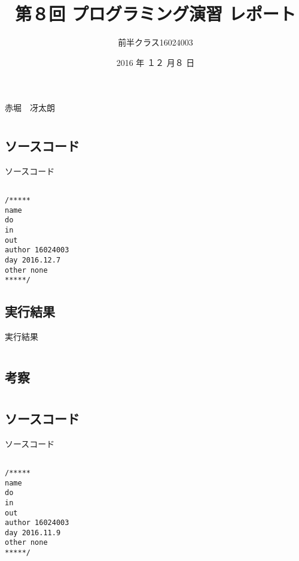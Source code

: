 \documentclass[a4j,titlepage]{jarticle}
\begin{document}

\title{第８回 プログラミング演習 レポート}

\author{前半クラス16024003}{赤堀　冴太朗}

\date{2016 年 １２ 月８ 日}
\maketitle


\section{}
\subsection{ソースコード}
\begin{breakitembox}[l]{ソースコード}
\begin{verbatim}

/*****
name 
do 
in 
out 
author 16024003
day 2016.12.7
other none
*****/

\end{verbatim}
\end{breakitembox}

\subsection{実行結果}
\begin{itembox}[l]{実行結果}
\begin{verbatim}

\end{verbatim}
\end{itembox}

\subsection{考察}


\section{}
\subsection{ソースコード}
\begin{breakitembox}[l]{ソースコード}
\begin{verbatim}

/*****
name 
do 
in 
out 
author 16024003
day 2016.11.9
other none 
*****/

\end{verbatim}
\end{breakitembox}
\end{document}

